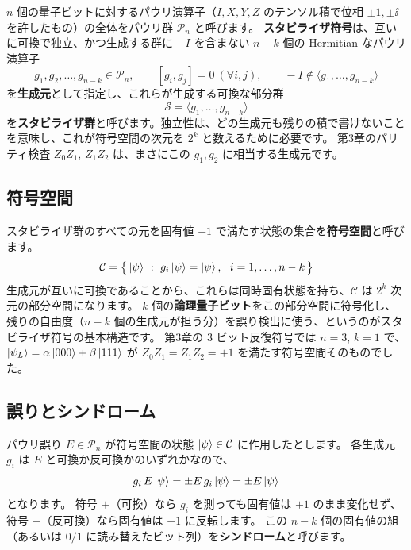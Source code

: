 $n$ 個の量子ビットに対するパウリ演算子（$I,X,Y,Z$ のテンソル積で位相 $\pm1,\pm\ii$ を許したもの）の全体をパウリ群 $\mathcal{P}_n$ と呼びます。
\textbf{スタビライザ符号}は、互いに可換で独立、かつ生成する群に $-I$ を含まない $n-k$ 個の Hermitian なパウリ演算子
\begin{equation}
  g_1, g_2, \dots, g_{n-k} \in \mathcal{P}_n, \qquad [g_i, g_j] = 0 \ (\forall i,j), \qquad -I \notin \langle g_1,\dots,g_{n-k}\rangle
\end{equation}
を\textbf{生成元}として指定し、これらが生成する可換な部分群
\begin{equation}
  \mathcal{S} = \langle g_1, \dots, g_{n-k} \rangle
\end{equation}
を\textbf{スタビライザ群}と呼びます\cite{gottesman1997stabilizer}。独立性は、どの生成元も残りの積で書けないことを意味し、これが符号空間の次元を $2^k$ と数えるために必要です。
第3章のパリティ検査 $Z_0Z_1$, $Z_1Z_2$ は、まさにこの $g_1,g_2$ に相当する生成元です。

\subsection{符号空間}

スタビライザ群のすべての元を固有値 $+1$ で満たす状態の集合を\textbf{符号空間}と呼びます。
\begin{equation}
  \mathcal{C} = \bigl\{\, \ket{\psi} \ :\ g_i \ket{\psi} = \ket{\psi}, \ \ i = 1,\dots,n-k \,\bigr\}
\end{equation}
生成元が互いに可換であることから、これらは同時固有状態を持ち、$\mathcal{C}$ は $2^k$ 次元の部分空間になります。
$k$ 個の\textbf{論理量子ビット}をこの部分空間に符号化し、残りの自由度（$n-k$ 個の生成元が担う分）を誤り検出に使う、というのがスタビライザ符号の基本構造です。
第3章の 3 ビット反復符号では $n=3$, $k=1$ で、$\ket{\psi_L}=\alpha\ket{000}+\beta\ket{111}$ が $Z_0Z_1=Z_1Z_2=+1$ を満たす符号空間そのものでした。

\subsection{誤りとシンドローム}

パウリ誤り $E \in \mathcal{P}_n$ が符号空間の状態 $\ket{\psi}\in\mathcal{C}$ に作用したとします。
各生成元 $g_i$ は $E$ と可換か反可換かのいずれかなので、
\begin{equation}
  g_i \, E \ket{\psi} = \pm E \, g_i \ket{\psi} = \pm E \ket{\psi}
\end{equation}
となります。
符号 $+$（可換）なら $g_i$ を測っても固有値は $+1$ のまま変化せず、符号 $-$（反可換）なら固有値は $-1$ に反転します。
この $n-k$ 個の固有値の組（あるいは $0/1$ に読み替えたビット列）を\textbf{シンドローム}と呼びます。

